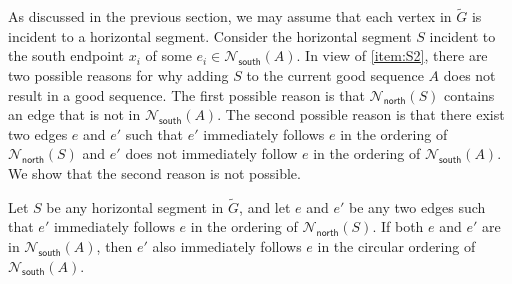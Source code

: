 \documentclass{article}\usepackage[a4paper,margin=20mm]{geometry}
\newcommand{\Nnorth}{\mathcal{N}_\mathsf{north}}
\newcommand{\Nsouth}{\mathcal{N}_\mathsf{south}}
\begin{document}
As discussed in the previous section, we may assume that each vertex in $\tilde{G}$ is incident to a horizontal segment. Consider the horizontal segment $S$ incident to the south endpoint $x_i$ of some $e_i \in \Nsouth(A)$. In view of \ref{item:S2}, there are two possible reasons for why adding $S$ to the current good sequence $A$ does not result in a good sequence. The first possible reason is that $\Nnorth(S)$ contains an edge that is not in $\Nsouth(A)$. The second possible reason is that there exist two edges $e$ and $e'$ such that $e'$ immediately follows $e$ in the ordering of $\Nnorth(S)$ and $e'$ does not immediately follow $e$ in the ordering of $\Nsouth(A)$. We show that the second reason is not possible. 

\begin{lemma}\label{lem-segment-ascending}
Let $S$ be any horizontal segment in $\tilde{G}$, and let  $e$ and $e'$ be any two edges such that $e'$ immediately follows $e$ in the ordering of $\Nnorth(S)$.
If both $e$ and $e'$ are in $\Nsouth(A)$, then $e'$ also immediately follows $e$ in the circular ordering of $\Nsouth(A)$.
\end{lemma}
\end{document}

